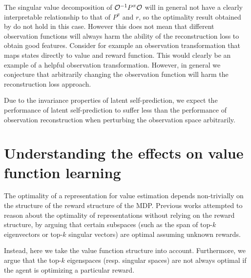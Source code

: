 The singular value decomposition of ${\mathcal{O}}^{-1}P^\pi{\mathcal{O}}$ will in general not have a clearly interpretable relationship to that of $P^\pi$ and $r$, so the optimality result obtained by \textcite{behzadian2019fast} do not hold in this case.
However this does not mean that different observation functions will always harm the ability of the reconstruction loss to obtain good features.
Consider for example an observation transformation that maps states directly to value and reward function.
This would clearly be an example of a helpful observation transformation.
However, in general we conjecture that arbitrarily changing the observation function will harm the reconstruction loss approach.

\begin{tcolorbox}[boxrule=0.2mm,colback=white,colframe=uoftblue,boxsep=0pt,top=3pt,bottom=5pt]
\begin{insight} 
\label{insight:understanding:2}
Due to the invariance properties of latent self-prediction, we expect the performance of latent self-prediction to suffer less than the performance of observation reconstruction when perturbing the observation space arbitrarily.
\end{insight}
\end{tcolorbox}


\section{Understanding the effects on value function learning}
\label{sec:understanding:auxilliary_tasks}

The optimality of a representation for value estimation depends non-trivially on the structure of the reward structure of the MDP. Previous works \parencite{behzadian2019fast, bellemare2019geometric, lelan2022generalization} attempted to reason about the optimality of representations without relying on the reward structure, by arguing that certain subspaces (such as the span of top-$k$ eigenvectors or top-$k$ singular vectors) are optimal assuming unknown rewards.

Instead, here we take the value function structure into account. Furthermore, we argue that the top-$k$ eigenspaces (resp. singular spaces) are not always optimal if the agent is optimizing a particular reward.


